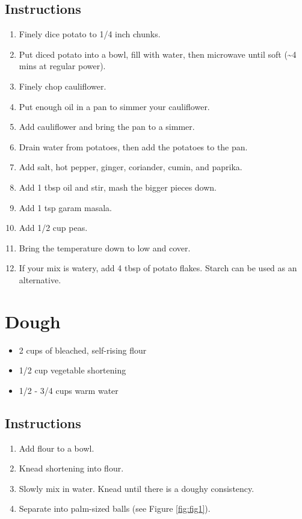 \subsection*{Instructions}

\begin{enumerate}
  \item Finely dice potato to 1/4 inch chunks.
  \item Put diced potato into a bowl, fill with water, then microwave until soft (\textasciitilde 4 mins at regular power).
  \item Finely chop cauliflower.
  \item Put enough oil in a pan to simmer your cauliflower.
  \item Add cauliflower and bring the pan to a simmer.
  \item Drain water from potatoes, then add the potatoes to the pan.
  \item Add salt, hot pepper, ginger, coriander, cumin, and paprika.
  \item Add 1 tbsp oil and stir, mash the bigger pieces down.
  \item Add 1 tsp garam masala.
  \item Add 1/2 cup peas.
  \item Bring the temperature down to low and cover.
  \item If your mix is watery, add 4 tbsp of potato flakes. Starch can be used as an alternative.
\end{enumerate}

\section*{Dough}

\begin{itemize}
  \item 2 cups of bleached, self-rising flour
  \item 1/2 cup vegetable shortening
  \item 1/2 - 3/4 cups warm water
\end{itemize}

\subsection*{Instructions}

\begin{enumerate}
  \item Add flour to a bowl.
  \item Knead shortening into flour.
  \item Slowly mix in water. Knead until there is a doughy consistency.
  \item Separate into palm-sized balls (see Figure \ref{fig:fig1}).
\end{enumerate}

